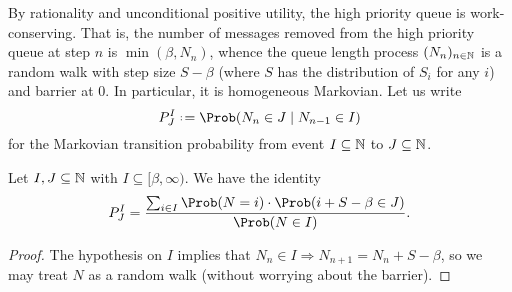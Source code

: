 \documentclass[a4paper,11pt]{article}
\begin{document}
By rationality and unconditional positive utility, the high priority queue is work-conserving.
%
That is, the number of messages removed from the high priority queue at step $n$ is $\min(\beta,N_{n})$, whence the queue length process $(N_{n})_{n\in\mathbb N}$ is a random walk with step size $S-\beta$ (where $S$ has the distribution of $S_i$ for any $i$) and barrier at $0$.
%
In particular, it is homogeneous Markovian.
%
Let us write
\begin{equation}
  P^I_J \defeq \Prob(N_{n} \in J \mid N_{n-1}\in I) 
\end{equation}
for the Markovian transition probability from event $I\subseteq\mathbb N$ to $J\subseteq\mathbb N$.

\begin{lemma}
\label{markov-transition-ratio}

  Let $I,J\subseteq\mathbb N$ with $I\subseteq[\beta,\infty)$. We have the identity
  \[
    P^I_J = \frac{\sum_{i\in I}\Prob(N=i)\cdot \Prob(i+S-\beta\in J)}
    { \Prob(N\in I) }.
  \]
  
\end{lemma}
%
\begin{proof}

  The hypothesis on $I$ implies that $N_n\in I\Rightarrow N_{n+1}=N_n+S-\beta$, so we may treat $N$ as a random walk (without worrying about the barrier).\qedhere

\end{proof}
\end{document}
